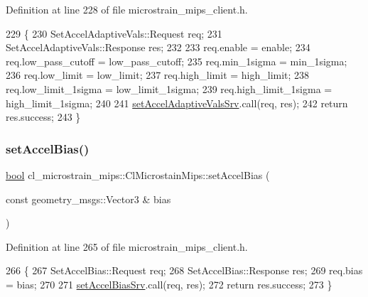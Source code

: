 Definition at line 228 of file microstrain\+\_\+mips\+\_\+client.\+h.


\begin{DoxyCode}
229     \{
230         SetAccelAdaptiveVals::Request req;
231         SetAccelAdaptiveVals::Response res;
232 
233         req.enable = enable;
234         req.low\_pass\_cutoff = low\_pass\_cutoff;
235         req.min\_1sigma = min\_1sigma;
236         req.low\_limit = low\_limit;
237         req.high\_limit = high\_limit;
238         req.low\_limit\_1sigma = low\_limit\_1sigma;
239         req.high\_limit\_1sigma = high\_limit\_1sigma;
240 
241         \hyperlink{classcl__microstrain__mips_1_1ClMicrostainMips_a0e22727b68e51261aa65605f236419e6}{setAccelAdaptiveValsSrv}.call(req, res);
242         \textcolor{keywordflow}{return} res.success;
243     \}
\end{DoxyCode}
\mbox{\label{classcl__microstrain__mips_1_1ClMicrostainMips_a535b7afce9ff4288c94077fe8fc30f79}} 
\subsubsection{\texorpdfstring{set\+Accel\+Bias()}{setAccelBias()}}
{\footnotesize\ttfamily \hyperlink{classbool}{bool} cl\+\_\+microstrain\+\_\+mips\+::\+Cl\+Microstain\+Mips\+::set\+Accel\+Bias (\begin{DoxyParamCaption}\item[{const geometry\+\_\+msgs\+::\+Vector3 \&}]{bias }\end{DoxyParamCaption})\hspace{0.3cm}{\ttfamily [inline]}}



Definition at line 265 of file microstrain\+\_\+mips\+\_\+client.\+h.


\begin{DoxyCode}
266     \{
267         SetAccelBias::Request req;
268         SetAccelBias::Response res;
269         req.bias = bias;
270 
271         \hyperlink{classcl__microstrain__mips_1_1ClMicrostainMips_ae2ea11655cba06e49307780d1f95e197}{setAccelBiasSrv}.call(req, res);
272         \textcolor{keywordflow}{return} res.success;
273     \}
\end{DoxyCode}
\mbox{\label{classcl__microstrain__mips_1_1ClMicrostainMips_a809131028b774a3026a3f6894db0dc8f}} 
